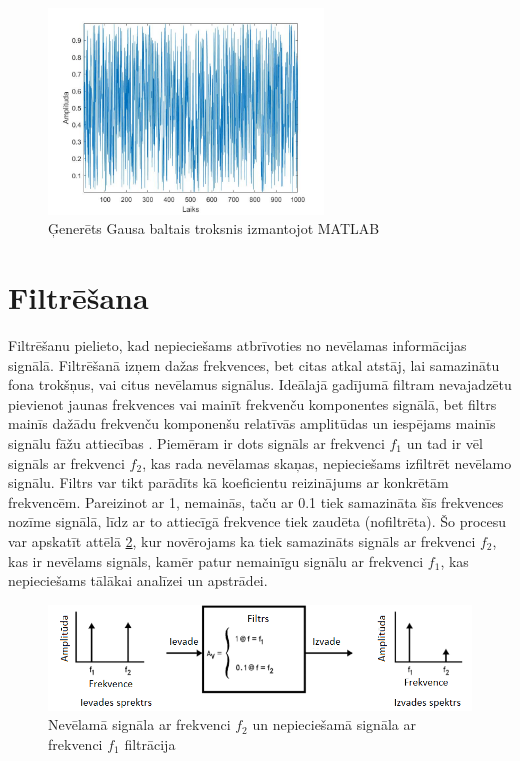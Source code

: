 \documentclass[12pt,paper=A4]{report}
\begin{document}
\begin{figure}[H] \centering
\includegraphics[width=0.65\textwidth]{white} 
\caption{Ģenerēts Gausa baltais troksnis izmantojot MATLAB \cite{Noises}}  \label{white-noise} 
\end{figure}

\section{Filtrēšana}
Filtrēšanu pielieto, kad nepieciešams atbrīvoties no nevēlamas informācijas signālā. Filtrēšanā izņem dažas frekvences, bet citas atkal atstāj, lai samazinātu fona trokšņus, vai citus nevēlamus signālus. Ideālajā gadījumā filtram nevajadzētu pievienot jaunas frekvences vai mainīt frekvenču komponentes signālā, bet filtrs mainīs dažādu frekvenču komponenšu relatīvās amplitūdas un iespējams mainīs signālu fāžu attiecības \cite{http://www.ti.com/lit/an/snoa224a/snoa224a.pdf}. 
Piemēram ir dots signāls ar frekvenci $f_1$ un tad ir vēl signāls ar frekvenci $f_2$, kas rada nevēlamas skaņas, nepieciešams izfiltrēt nevēlamo signālu. 
Filtrs var tikt parādīts kā koeficientu reizinājums ar konkrētām frekvencēm. Pareizinot ar 1, nemainās, taču ar 0.1 tiek samazināta šīs frekvences nozīme signālā, līdz ar to attiecīgā frekvence tiek zaudēta (nofiltrēta).
 Šo procesu var apskatīt attēlā \ref{filtering}, kur novērojams ka tiek samazināts signāls ar frekvenci $f_2$, kas ir nevēlams signāls, kamēr patur nemainīgu signālu ar frekvenci $f_1$, kas nepieciešams tālākai analīzei un apstrādei. 

\begin{figure}[H] \centering
\includegraphics[width=1.00\textwidth]{filtering} 
\caption{Nevēlamā signāla ar frekvenci $f_2$ un nepieciešamā signāla ar frekvenci $f_1$ filtrācija \cite{http://www.swarthmore.edu/NatSci/echeeve1/Ref/DataSheet/IntroToFilters.pdf}}  \label{filtering} 
\end{figure}
\end{document}
